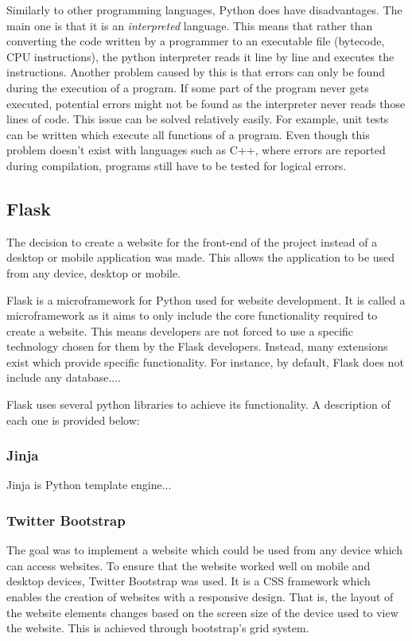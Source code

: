 \documentclass[12pt,a4paper]{article}
\begin{document}
Similarly to other programming languages, Python does have disadvantages. The main one is that it is an \textit{interpreted} language. This means that rather than converting the code written by a programmer to an executable file (bytecode, CPU instructions), the python interpreter reads it line by line and executes the instructions. Another problem caused by this is that errors can only be found during the execution of a program. If some part of the program never gets executed, potential errors might not be found as the interpreter never reads those lines of code. This issue can be solved relatively easily. For example, unit tests can be written which execute all functions of a program. Even though this problem doesn't exist with languages such as C++, where errors are reported during compilation, programs still have to be tested for logical errors.

\subsection{Flask}
The decision to create a website for the front-end of the project instead of a desktop or mobile application was made. This allows the application to be used from any device, desktop or mobile. 

Flask is a microframework for Python used for website development. It is called a microframework as it aims to only include the core functionality required to create a website. This means developers are not forced to use a specific technology chosen for them by the Flask developers. Instead, many extensions exist which provide specific functionality. For instance, by default, Flask does not include any database....

Flask uses several python libraries to achieve its functionality. A description of each one is provided below:

\subsubsection{Jinja}
Jinja is Python template engine...

\subsubsection{Twitter Bootstrap}
The goal was to implement a website which could be used from any device which can access websites. To ensure that the website worked well on mobile and desktop devices, Twitter Bootstrap was used. It is a CSS framework which enables the creation of websites with a responsive design. That is, the layout of the website elements changes based on the screen size of the device used to view the website. This is achieved through bootstrap's grid system.
\end{document}
